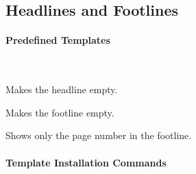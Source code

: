 




\subsection{Headlines and Footlines}

\label{section-head-templates}

\paragraph{Predefined Templates}\ 

\begin{command}{\beamertemplateheadempty}
  Makes the headline empty.
\end{command}

\begin{command}{\beamertemplatefootempty}
  Makes the footline empty.
\end{command}

\begin{command}{\beamertemplatefootpagenumber}
  Shows only the page number in the footline.
\end{command}



\paragraph{Template Installation Commands}\ 

